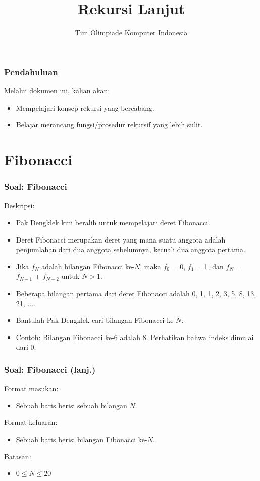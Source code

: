 

\title{Rekursi Lanjut}
\author{Tim Olimpiade Komputer Indonesia}
\date{}



\begin{frame}
\titlepage
\end{frame}

\begin{frame}
\frametitle{Pendahuluan}
Melalui dokumen ini, kalian akan:
\begin{itemize}
  \item Mempelajari konsep rekursi yang bercabang.
  \item Belajar merancang fungsi/prosedur rekursif yang lebih sulit.
\end{itemize}
\end{frame}

\section{Fibonacci}
\frame{\sectionpage}

\begin{frame}
\frametitle{Soal: Fibonacci}
Deskripsi:
\begin{itemize}
  \item Pak Dengklek kini beralih untuk mempelajari deret Fibonacci.
  \item Deret Fibonacci merupakan deret yang mana suatu anggota adalah penjumlahan dari dua anggota sebelumnya, kecuali dua anggota pertama.
  \item Jika $f_N$ adalah bilangan Fibonacci ke-$N$, maka $f_0$ = 0, $f_1$ = 1, dan $f_N$ = $f_{N-1}$ + $f_{N-2}$ untuk $N > 1$.
  \item Beberapa bilangan pertama dari deret Fibonacci adalah 0, 1, 1, 2, 3, 5, 8, 13, 21, $\dots$.
  \item Bantulah Pak Dengklek cari bilangan Fibonacci ke-$N$.
  \item Contoh: Bilangan Fibonacci ke-6 adalah 8. Perhatikan bahwa indeks dimulai dari 0.
\end{itemize}
\end{frame}

\begin{frame}
\frametitle{Soal: Fibonacci (lanj.) }
Format masukan:
\begin{itemize}
    \item Sebuah baris berisi sebuah bilangan $N$.
\end{itemize}
Format keluaran:
\begin{itemize}
    \item Sebuah baris berisi bilangan Fibonacci ke-$N$.
\end{itemize}
Batasan:
\begin{itemize}
    \item $0 \le N \le 20$
\end{itemize}
\end{frame}

